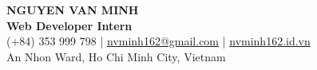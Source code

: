 \begin{center}
    {\fontsize{25}{28}\selectfont\bfseries NGUYEN VAN MINH}\\[4pt]
    {\large\bfseries Web Developer Intern}\\[6pt]
    \small (+84) 353 999 798 \;|\; \href{mailto:nvminh162@gmail.com}{nvminh162@gmail.com} \;|\; \href{https://nvminh162.id.vn}{nvminh162.id.vn}\\[3pt]
    \small An Nhon Ward, Ho Chi Minh City, Vietnam
    \\ \vspace{-1pt}
\end{center}
